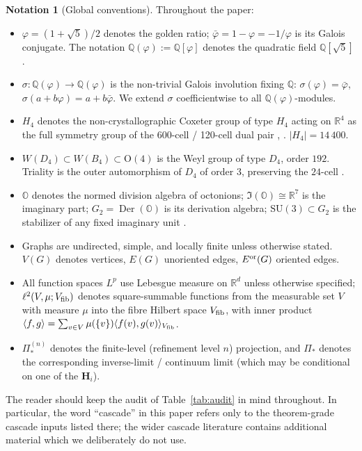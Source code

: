 \documentclass[11pt, a4paper]{amsart}
\theoremstyle{definition}
\newtheorem{notation}[theorem]{Notation}
\newcommand{\R}{\mathbb{R}}
\newcommand{\Q}{\mathbb{Q}}
\newcommand{\OO}{\mathbb{O}}
\newcommand{\pphi}{\varphi}
\newcommand{\Der}{\operatorname{Der}}
\begin{document}
\begin{notation}[Global conventions]
\label{not:conventions}
Throughout the paper:
\begin{itemize}
\item $\pphi = (1 + \sqrt 5)/2$ denotes the golden ratio; $\bar\pphi
  = 1 - \pphi = -1/\pphi$ is its Galois conjugate. The notation
  $\Q(\pphi) := \Q[\pphi]$ denotes the quadratic field $\Q[\sqrt 5]$.
\item $\sigma \colon \Q(\pphi) \to \Q(\pphi)$ is the non-trivial
  Galois involution fixing $\Q$: $\sigma(\pphi) = \bar\pphi$,
  $\sigma(a + b\pphi) = a + b\bar\pphi$. We extend $\sigma$
  coefficientwise to all $\Q(\pphi)$-modules.
\item $H_4$ denotes the non-crystallographic Coxeter group of type
  $H_4$ acting on $\R^4$ as the full symmetry group of the 600-cell
  / 120-cell dual pair \cite[\S 3]{CascadeEmbeddings},
  \cite{CoxeterRegularPolytopes}. $|H_4| = 14\,400$.
\item $W(D_4) \subset W(B_4) \subset \mathrm{O}(4)$ is the Weyl
  group of type $D_4$, order $192$. Triality is the outer
  automorphism of $D_4$ of order $3$, preserving the $24$-cell
  \cite[\S 2]{CascadeEmbeddings}.
\item $\OO$ denotes the normed division algebra of octonions;
  $\Im(\OO) \cong \R^7$ is the imaginary part; $G_2 = \Der(\OO)$
  is its derivation algebra; $\mathrm{SU}(3) \subset G_2$ is the
  stabilizer of any fixed imaginary unit \cite[\S 6]{CascadeEmbeddings}.
\item Graphs are undirected, simple, and locally finite unless
  otherwise stated. $V(G)$ denotes vertices, $E(G)$ unoriented
  edges, $E^{\rm or}(G)$ oriented edges.
\item All function spaces $L^p$ use Lebesgue measure on $\R^d$
  unless otherwise specified; $\ell^2(V, \mu; V_{\rm fib})$ denotes
  square-summable functions from the measurable set $V$ with
  measure $\mu$ into the fibre Hilbert space $V_{\rm fib}$, with
  inner product $\langle f, g \rangle = \sum_{v \in V} \mu(\{v\})
  \langle f(v), g(v) \rangle_{V_{\rm fib}}$.
\item $\Pi_*^{(n)}$ denotes the finite-level (refinement level $n$)
  projection, and $\Pi_*$ denotes the corresponding inverse-limit /
  continuum limit (which may be conditional on one of the
  $\mathbf{H}_i$).
\end{itemize}
\end{notation}

The reader should keep the audit of Table~\ref{tab:audit} in mind
throughout. In particular, the word ``cascade'' in this paper
refers only to the theorem-grade cascade inputs listed there; the
wider cascade literature contains additional material which we
deliberately do not use.
\end{document}
